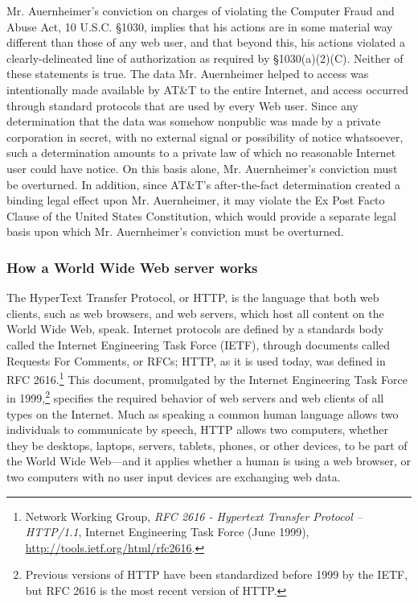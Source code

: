 \documentclass{article}
\begin{document}
	Mr. Auernheimer's conviction on charges of violating the Computer Fraud and Abuse Act, 10 U.S.C. \S1030, implies that his actions are in some material way different than those of any web user, and that beyond this, his actions violated a clearly-delineated line of authorization as required by \S1030(a)(2)(C). Neither of these statements is true. The data Mr. Auernheimer helped to access was intentionally made available by AT\&T to the entire Internet, and access occurred through standard protocols that are used by every Web user. Since any determination that the data was somehow nonpublic was made by a private corporation in secret, with no external signal or possibility of notice whatsoever, such a determination amounts to a private law of which no reasonable Internet user could have notice. On this basis alone, Mr. Auernheimer's conviction must be overturned. In addition, since AT\&T's after-the-fact determination created a binding legal effect upon Mr. Auernheimer, it may violate the Ex Post Facto Clause of the United States Constitution, which would provide a separate legal basis upon which Mr. Auernheimer's conviction must be overturned.
	
	\subsubsection{How a World Wide Web server works}
	\label{subsubsec:www}
	
	The HyperText Transfer Protocol, or HTTP, is the language that both web clients, such as web browsers, and web servers, which host all content on the World Wide Web, speak. Internet protocols are defined by a standards body called the Internet Engineering Task Force (IETF), through documents called Requests For Comments, or RFCs; HTTP, as it is used today, was defined in RFC 2616.\footnote{Network Working Group, \emph{RFC 2616 - Hypertext Transfer Protocol -- HTTP/1.1}, Internet Engineering Task Force (June 1999), \url{http://tools.ietf.org/html/rfc2616}.} This document, promulgated by the Internet Engineering Task Force in 1999,\footnote{Previous versions of HTTP have been standardized before 1999 by the IETF, but RFC 2616 is the most recent version of HTTP.} specifies the required behavior of web servers and web clients of all types on the Internet. Much as speaking a common human language allows two individuals to communicate by speech, HTTP allows two computers, whether they be desktops, laptops, servers, tablets, phones, or other devices, to be part of the World Wide Web---and it applies whether a human is using a web browser, or two computers with no user input devices are exchanging web data.
	
\end{document}
